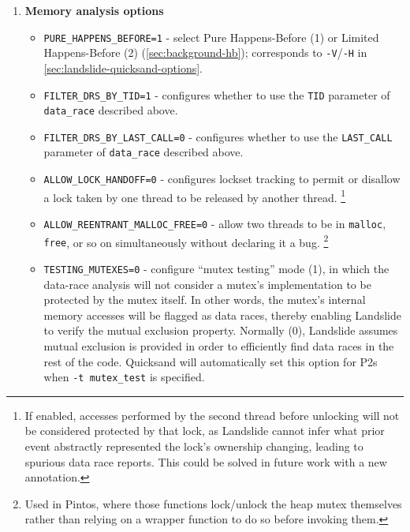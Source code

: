 \begin{enumerate}
\item {\bf Memory analysis options}
\begin{itemize}
	\item {\tt PURE\_HAPPENS\_BEFORE=1} - select Pure Happens-Before (1) or Limited Happens-Before (2) (\cref{sec:background-hb});
		corresponds to {\tt -V}/{\tt -H} in \cref{sec:landslide-quicksand-options}.
	\item {\tt FILTER\_DRS\_BY\_TID=1} - configures whether to use the {\tt TID} parameter of {\tt data\_\allowbreak{}race} described above.
	\item {\tt FILTER\_DRS\_BY\_LAST\_CALL=0} - configures whether to use the {\tt LAST\_CALL} parameter of {\tt data\_race} described above.
	\item {\tt ALLOW\_LOCK\_HANDOFF=0} - configures lockset tracking to permit or disallow a lock taken by one thread to be released by another thread.%
		\footnote{If enabled, accesses performed by the second thread before unlocking will not be considered protected by that lock,
			as Landslide cannot infer what prior event abstractly represented the lock's ownership changing,
			leading to spurious data race reports.
			This could be solved in future work with a new annotation.}
	\item {\tt ALLOW\_REENTRANT\_MALLOC\_FREE=0} - allow two threads to be in {\tt malloc}, {\tt free}, or so on simultaneously without declaring it a bug.%
		\footnote{Used in Pintos, where those functions lock/unlock the heap mutex themselves rather than relying on a wrapper function to do so before invoking them.}
	\item {\tt TESTING\_MUTEXES=0} - configure ``mutex testing'' mode (1),
		in which the data-race analysis will not consider a mutex's implementation to be protected by the mutex itself.
		In other words, the mutex's internal memory accesses will be flagged as data races,
		thereby enabling Landslide to verify the mutual exclusion property.
		Normally (0), Landslide assumes mutual exclusion is provided in order to efficiently find data races in the rest of the code.
		Quicksand will automatically set this option for P2s when {\tt -t mutex\_test} is specified.
\end{itemize}


\end{enumerate}
